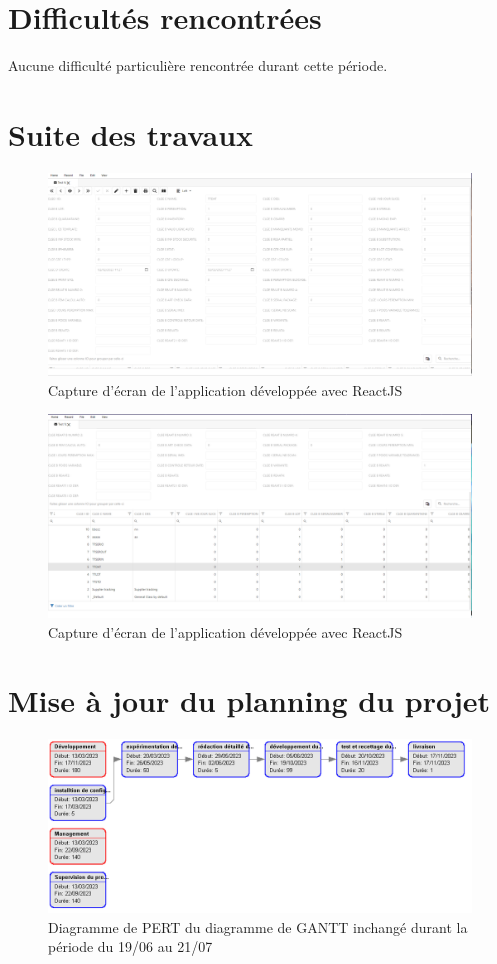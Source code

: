 \documentclass[a4paper, 12pt, french]{article}
\begin{document}
	\section{Difficultés rencontrées}
		Aucune difficulté particulière rencontrée durant cette période.

	\newpage
	
	\section{Suite des travaux}
		\begin{figure}[h!]
			\includegraphics[width=\linewidth]{mph_web_reactts_juillet_1.png}
			\caption{Capture d'écran de l'application développée avec ReactJS}
		\end{figure}
		\begin{figure}[h!]
			\includegraphics[width=\linewidth]{mph_web_reactts_juillet_2.png}
			\caption{Capture d'écran de l'application développée avec ReactJS}
		\end{figure}

	\section{Mise à jour du planning du projet}
		\begin{figure}[h!]
			\includegraphics[width=\linewidth]{gantt_13_04_13_05.png}
			\caption{Diagramme de PERT du diagramme de GANTT inchangé durant la période du 19/06 au 21/07}
		\end{figure}
		
		
\end{document}
